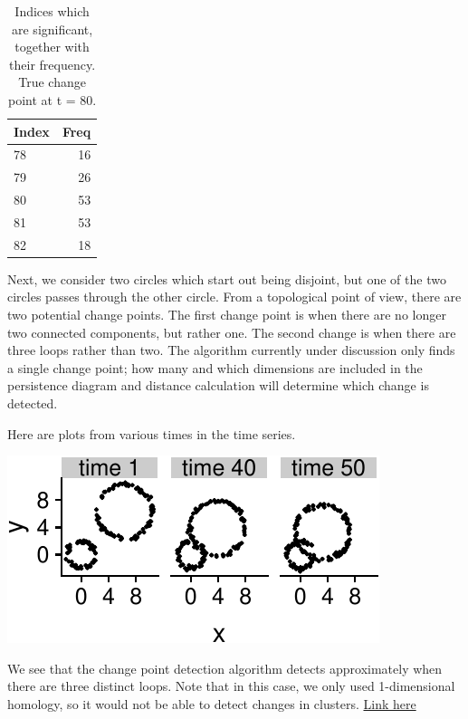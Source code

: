 \documentclass[smallextended]{svjour3}       %
\begin{document}
\begin{longtable}[t]{lr}
\caption{\label{tab:unnamed-chunk-2}Indices which are significant, together with their frequency. True change point at t = 80.}\\
\toprule
Index & Freq\\
\midrule
78 & 16\\
79 & 26\\
80 & 53\\
81 & 53\\
82 & 18\\
\bottomrule
\end{longtable}

Next, we consider two circles which start out being disjoint, but one of
the two circles passes through the other circle. From a topological
point of view, there are two potential change points. The first change
point is when there are no longer two connected components, but rather
one. The second change is when there are three loops rather than two.
The algorithm currently under discussion only finds a single change
point; how many and which dimensions are included in the persistence
diagram and distance calculation will determine which change is
detected.

Here are plots from various times in the time series.

\begin{center}\includegraphics{springer_template_files/figure-latex/chunk_7-1} \end{center}

We see that the change point detection algorithm detects approximately
when there are three distinct loops. Note that in this case, we only
used 1-dimensional homology, so it would not be able to detect changes
in clusters. \href{http://stat.slu.edu/~speegle/Circles2.gif}{Link here}
\end{document}
